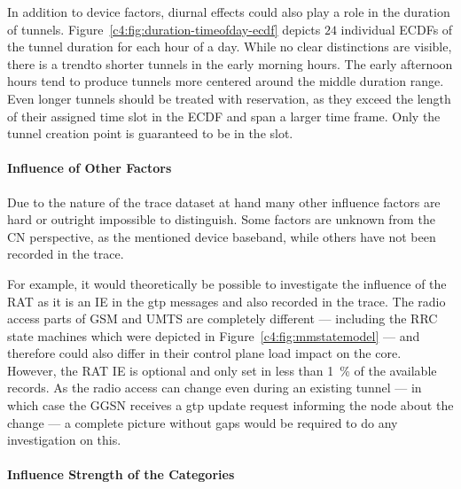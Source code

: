 In addition to device factors, diurnal effects could also play a role in the duration of tunnels. Figure~\ref{c4:fig:duration-timeofday-ecdf} depicts $24$ individual \glspl{ECDF} of the tunnel duration for each hour of a day. While no clear distinctions are visible, there is a trendto shorter tunnels in the early morning hours. The early afternoon hours tend to produce tunnels more centered around the middle duration range. Even longer tunnels should be treated with reservation, as they exceed the length of their assigned time slot in the \gls{ECDF} and span a larger time frame. Only the tunnel creation point is guaranteed to be in the slot.


\paragraph{Influence of Other Factors}

Due to the nature of the trace dataset at hand many other influence factors are hard or outright impossible to distinguish. Some factors are unknown from the \gls{CN} perspective, as the mentioned device baseband, while others have not been recorded in the trace.

For example, it would theoretically be possible to investigate the influence of the \gls{RAT} as it is an \gls{IE} in the \gls{gtp} messages and also recorded in the trace. The radio access parts of \gls{GSM} and \gls{UMTS} are completely different --- including the \gls{RRC} state machines which were depicted in Figure~\ref{c4:fig:mmstatemodel} --- and therefore could also differ in their control plane load impact on the core. However, the \gls{RAT} \gls{IE} is optional and only set in less than \SI{1}{\percent} of the available records. As the radio access can change even during an existing tunnel --- in which case the \gls{GGSN} receives a \gls{gtp} update request informing the node about the change --- a complete picture without gaps would be required to do any investigation on this.


\paragraph{Influence Strength of the Categories}

